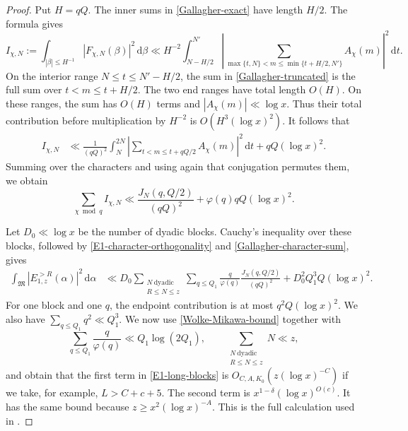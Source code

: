 \documentclass[12pt,reqno]{amsart}
\numberwithin{equation}{section}
\theoremstyle{plain}
\theoremstyle{remark}
\newcommand{\dif}{\mathrm{d}}
\newcommand{\majorarc}{\mathfrak{M}}
\begin{document}
\begin{proof}
Put $H=qQ$.
The inner sums in \eqref{Gallagher-exact} have length $H/2$.
The formula gives
\begin{equation}\label{Gallagher-truncated}
 I_{\chi,N}
 :=\int_{|\beta|\leq H^{-1}}
 |F_{\chi,N}(\beta)|^2\,\dif\beta
 \ll H^{-2}\int_{N-H/2}^{N'}
 \left|\sum_{\max\{t,N\}<m\leq
 \min\{t+H/2,N'\}}A_\chi(m)\right|^2\,\dif t.
\end{equation}
On the interior range $N\leq t\leq N'-H/2$, the sum in
\eqref{Gallagher-truncated} is the full sum over $t<m\leq t+H/2$.
The two end ranges have total length $O(H)$.
On these ranges, the sum has $O(H)$ terms and
$|A_\chi(m)|\ll\log x$.
Thus their total contribution before multiplication by $H^{-2}$ is
$O(H^3(\log x)^2)$.
It follows that
\begin{align*}
 I_{\chi,N}
 &\ll \frac1{(qQ)^2}\int_N^{2N}
 \left|\sum_{t<m\leq t+qQ/2}A_\chi(m)\right|^2\,\dif t
 +qQ(\log x)^2.                              \label{Gallagher-block}
\end{align*}
Summing over the characters and using again that conjugation permutes
them, we obtain
\begin{equation}\label{Gallagher-character-sum}
 \sum_{\chi\bmod q}I_{\chi,N}
 \ll \frac{J_N(q,Q/2)}{(qQ)^2}
      +\varphi(q)qQ(\log x)^2.
\end{equation}

Let $D_0\ll\log x$ be the number of dyadic blocks.
Cauchy's inequality over these blocks, followed by
\eqref{E1-character-orthogonality} and
\eqref{Gallagher-character-sum}, gives
\begin{align}
 \int_{\majorarc}|E_{1,z}^{>R}(\alpha)|^2\,\dif\alpha
 &\ll D_0
 \sum_{\substack{N\ \mathrm{dyadic}\\R\leq N\leq z}}
 \sum_{q\leq Q_1}\frac q{\varphi(q)}
 \frac{J_N(q,Q/2)}{(qQ)^2}
 +D_0^2Q_1^3Q(\log x)^2.
 \label{E1-long-blocks}
\end{align}
For one block and one $q$, the endpoint contribution is at most
$q^2Q(\log x)^2$.
We also have $\sum_{q\leq Q_1}q^2\ll Q_1^3$.
We now use \eqref{Wolke-Mikawa-bound} together with
\[
 \sum_{q\leq Q_1}\frac q{\varphi(q)}
 \ll Q_1\log(2Q_1),
 \qquad
 \sum_{\substack{N\ \mathrm{dyadic}\\R\leq N\leq z}}N\ll z,
\]
and obtain that the first term in \eqref{E1-long-blocks} is
$O_{C,A,K_0}(z(\log x)^{-C})$ if we take, for example,
$L>C+c+5$.
The second term is $x^{1-\delta}(\log x)^{O(c)}$.
It has the same bound because $z\geq x^2(\log x)^{-A}$.
This is the full calculation used in
\cite[(6.6) to (6.8)]{BaierZhao2007}.


\end{proof}
\end{document}
